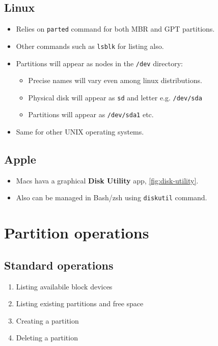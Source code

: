 \documentclass[slides]{pgnotes}
\begin{document}
\subsection{Linux}

\begin{itemize}
\item Relies on \texttt{parted} command for both MBR and GPT partitions.
\item Other commands such as \texttt{lsblk} for listing also.
\item Partitions will appear as nodes in the \texttt{/dev} directory:
  \begin{itemize}
  \item Precise names will vary even among linux distributions.
  \item Physical disk will appear as \texttt{sd} and letter e.g. \texttt{/dev/sda}
  \item Partitions will appear as \texttt{/dev/sda1} etc. 
  \end{itemize}
\item Same for other UNIX operating systems.
\end{itemize}

\newpage
\subsection{Apple}

\begin{itemize}
\item Macs hava a graphical \textbf{Disk Utility} app, \autoref{fig:disk-utility}.
\item Also can be managed in Bash/zsh using \texttt{diskutil} command. 
\end{itemize}

\newpage
{}

\newpage
\section{Partition operations}

\subsection{Standard operations}

\begin{enumerate}
\item Listing availabile block devices
\item Listing existing partitions and free space
\item Creating a partition
\item Deleting a partition
\end{enumerate}
\end{document}

